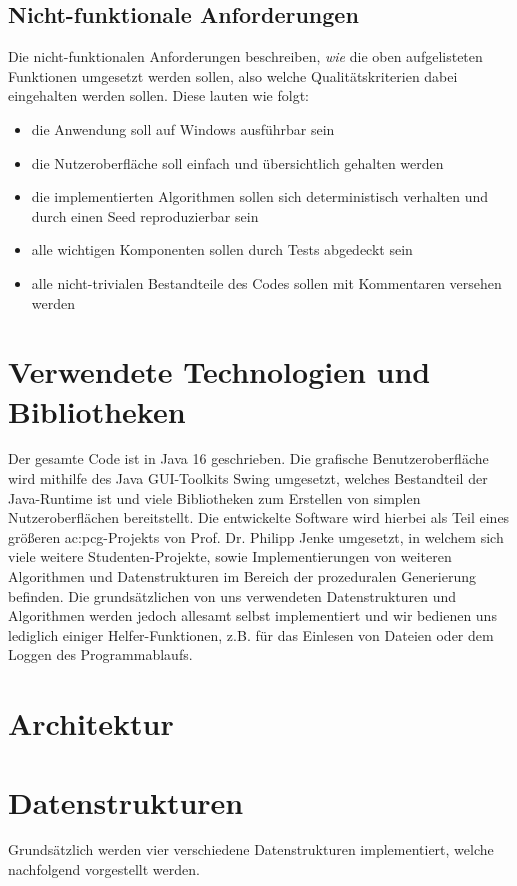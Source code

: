 \subsection{Nicht-funktionale Anforderungen}
Die nicht-funktionalen Anforderungen beschreiben, \textit{wie} die oben aufgelisteten Funktionen umgesetzt werden sollen, also
welche Qualitätskriterien dabei eingehalten werden sollen. Diese lauten wie folgt:

\begin{itemize}
    \item die Anwendung soll auf Windows ausführbar sein
    \item die Nutzeroberfläche soll einfach und übersichtlich gehalten werden
    \item die implementierten Algorithmen sollen sich deterministisch verhalten und durch einen Seed reproduzierbar sein
    \item alle wichtigen Komponenten sollen durch Tests abgedeckt sein
    \item alle nicht-trivialen Bestandteile des Codes sollen mit Kommentaren versehen werden
\end{itemize}

\section{Verwendete Technologien und Bibliotheken}
Der gesamte Code ist in Java 16 geschrieben. Die grafische Benutzeroberfläche wird mithilfe des Java GUI-Toolkits Swing umgesetzt,
welches Bestandteil der Java-Runtime ist und viele Bibliotheken zum Erstellen von simplen Nutzeroberflächen bereitstellt. Die
entwickelte Software wird hierbei als Teil eines größeren \gls{ac:pcg}-Projekts von Prof. Dr. Philipp Jenke umgesetzt, in welchem
sich viele weitere Studenten-Projekte, sowie Implementierungen von weiteren Algorithmen und Datenstrukturen im Bereich der prozeduralen
Generierung befinden. Die grundsätzlichen von uns verwendeten Datenstrukturen und Algorithmen werden jedoch allesamt selbst implementiert
und wir bedienen uns lediglich einiger Helfer-Funktionen, z.B. für das Einlesen von Dateien oder dem Loggen des Programmablaufs.

\section{Architektur}

\section{Datenstrukturen}
Grundsätzlich werden vier verschiedene Datenstrukturen implementiert, welche nachfolgend vorgestellt werden.

